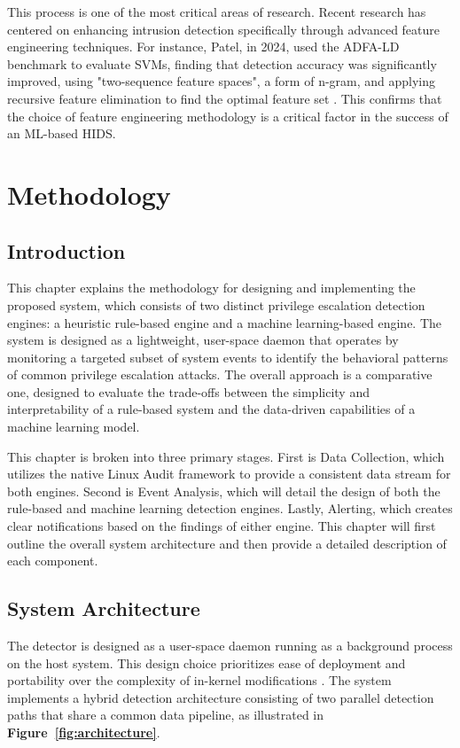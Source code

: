 \documentclass[journal]{./IEEEtran}
\begin{document}
This process is one of the most critical areas of research. Recent research has centered on enhancing intrusion detection specifically through advanced feature engineering techniques. For instance, Patel, in 2024, used the ADFA-LD benchmark to evaluate SVMs, finding that detection accuracy was significantly improved, using "two-sequence feature spaces", a form of n-gram, and applying recursive feature elimination to find the optimal feature set \cite{patel2024}. This confirms that the choice of feature engineering methodology is a critical factor in the success of an ML-based HIDS.
\section{Methodology}
\subsection{Introduction}
This chapter explains the methodology for designing and implementing the proposed system, which consists of two distinct privilege escalation detection engines: a heuristic rule-based engine and a machine learning-based engine. The system is designed as a lightweight, user-space daemon that operates by monitoring a targeted subset of system events to identify the behavioral patterns of common privilege escalation attacks. The overall approach is a comparative one, designed to evaluate the trade-offs between the simplicity and interpretability of a rule-based system and the data-driven capabilities of a machine learning model.

This chapter is broken into three primary stages. First is Data Collection, which utilizes the native Linux Audit framework to provide a consistent data stream for both engines. Second is Event Analysis, which will detail the design of both the rule-based and machine learning detection engines. Lastly, Alerting, which creates clear notifications based on the findings of either engine. This chapter will first outline the overall system architecture and then provide a detailed description of each component.

\subsection{System Architecture}
The detector is designed as a user-space daemon running as a background process on the host system. This design choice prioritizes ease of deployment and portability over the complexity of in-kernel modifications \cite{qiang2018}. The system implements a hybrid detection architecture consisting of two parallel detection paths that share a common data pipeline, as illustrated in \textbf{Figure~\ref{fig:architecture}}.
\end{document}

